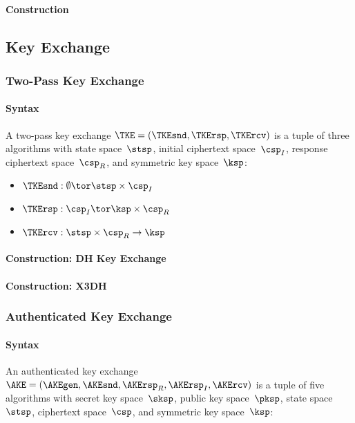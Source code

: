 \documentclass[a4paper,orivec]{llncs}
\begin{document}
\paragraph{Construction}


\subsection{Key Exchange}

\subsubsection{Two-Pass Key Exchange}

\paragraph{Syntax}
A two-pass key exchange $\TKE=(\TKEsnd,\TKErsp,\TKErcv)$ is a tuple of three algorithms with state space~$\stsp$, initial ciphertext space~$\csp_I$, response ciphertext space~$\csp_R$, and symmetric key space~$\ksp$:

\begin{itemize}
    \item $\TKEsnd: \emptyset \tor \stsp\times\csp_I$
    \item $\TKErsp: \csp_I \tor \ksp\times\csp_R$
    \item $\TKErcv: \stsp\times\csp_R \to \ksp$
\end{itemize}

\paragraph{Construction: DH Key Exchange}

\paragraph{Construction: X3DH}

\subsubsection{Authenticated Key Exchange}

\paragraph{Syntax}
An authenticated key exchange $\AKE=(\AKEgen,\allowbreak\AKEsnd,\allowbreak\AKErsp_R,\allowbreak\AKErsp_I,\allowbreak\AKErcv)$ is a tuple of five algorithms with secret key space~$\sksp$, public key space~$\pksp$, state space~$\stsp$, ciphertext space~$\csp$, and symmetric key space~$\ksp$:
\end{document}
